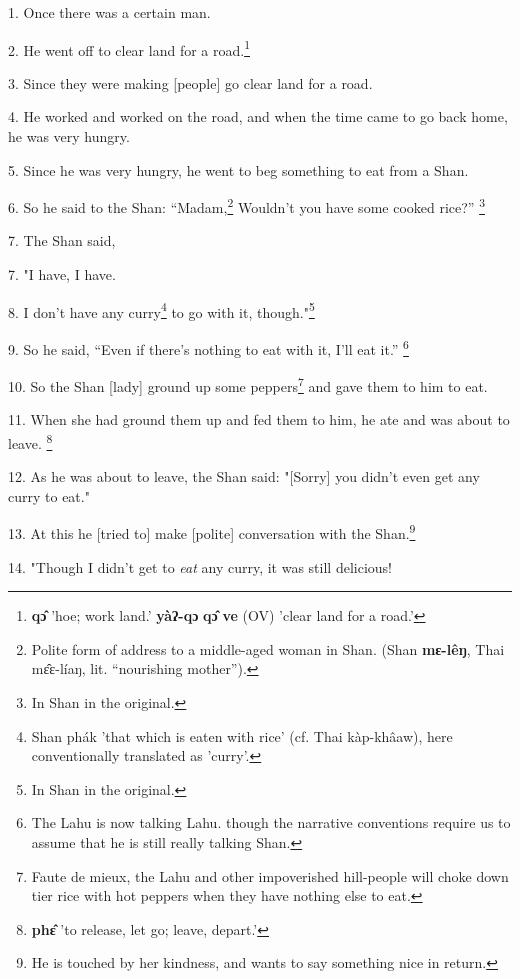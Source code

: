 \setcounter{footnote}{0}


1. Once there was a certain man.

2. He went off to clear land for a road.\footnote{\textbf{qɔ̂} 'hoe; work land.' \textbf{yàʔ-qɔ} \textbf{qɔ̂} \textbf{ve} (OV) 'clear land for a road.'}

3. Since they were making [people] go clear land for a road.

4. He worked and worked on the road, and when the time came to go back home, he
was very hungry.

5. Since he was very hungry, he went to beg something to eat from a Shan.

6. So he said to the Shan: ``Madam,\footnote{Polite form of address to a middle-aged woman in Shan. (Shan \textbf{mɛ-lêŋ}, Thai mɛ̂ɛ-líaŋ, lit. ``nourishing mother'').} Wouldn't you have some cooked rice?''
\footnote{In Shan in the original.}

7. The Shan said,

7. "I have, I have.

8. I don't have any curry\footnote{Shan phák 'that which is eaten with rice' (cf. Thai kàp-khâaw), here conventionally translated as 'curry'.} to go with it, though."\footnote{In Shan in the original.}

9. So he said, ``Even if there's nothing to eat with it, I'll eat it.''
\footnote{The Lahu is now talking Lahu. though the narrative conventions require us to assume that he is still really talking Shan.}

10. So the Shan [lady] ground up some peppers\footnote{Faute de mieux, the Lahu and other impoverished hill-people will choke down tier rice with hot peppers when they have nothing else to eat.} and gave them to him to eat.

11. When she had ground them up and fed them to him, he ate and was about to leave.
\footnote{\textbf{phɛ̂} 'to release, let go; leave, depart.'}

12. As he was about to leave, the Shan said: "[Sorry] you didn't even get
any curry to eat."

13. At this he [tried to] make [polite] conversation with the Shan.\footnote{He is touched by her kindness, and wants to say something nice in return.}

14. "Though I didn't get to \textit{eat} any curry, it was still delicious!

